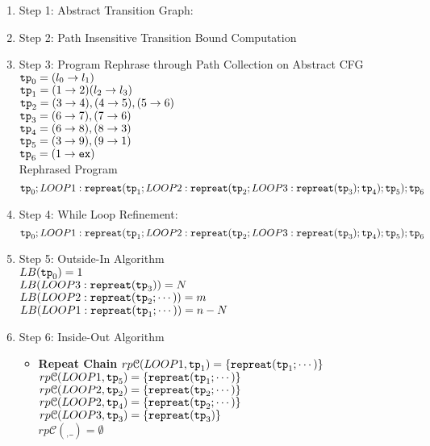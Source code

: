 \begin{enumerate}
    \item Step 1: Abstract Transition Graph:

\item Step 2: Path Insensitive Transition Bound Computation

\item Step 3: Program Rephrase through Path Collection on Abstract CFG
$\mathtt{tp}_0 = (l_0 \to l_1)$
\\
$\mathtt{tp}_1 = (1 \to 2) (l_2 \to l_3)$
\\
$\mathtt{tp}_2 = (3 \to 4), (4 \to 5), (5 \to 6)$
\\
$\mathtt{tp}_3 = (6 \to 7), (7 \to 6)$
\\
$\mathtt{tp}_4 = (6 \to 8), (8 \to 3)$
\\
$\mathtt{tp}_5 = (3 \to 9), (9 \to 1)$
\\
$\mathtt{tp}_6 = (1 \to \mathtt{ex})$
\\
Rephrased Program
\[
\mathtt{tp}_0 ; LOOP1: \mathtt{repreat}(\mathtt{tp}_1; LOOP2: \mathtt{repreat}(\mathtt{tp}_2; LOOP3 : \mathtt{repreat}(\mathtt{tp}_3); \mathtt{tp}_4); \mathtt{tp}_5); \mathtt{tp}_6
\]
\item Step 4: While Loop Refinement:
\[
\mathtt{tp}_0 ; LOOP1: \mathtt{repreat}(\mathtt{tp}_1; LOOP2: \mathtt{repreat}(\mathtt{tp}_2; LOOP3 : \mathtt{repreat}(\mathtt{tp}_3); \mathtt{tp}_4); \mathtt{tp}_5); \mathtt{tp}_6
\]
\item Step 5: Outside-In Algorithm
\\
$LB(\mathtt{tp}_0) = 1$
\\
$LB(LOOP3 : \mathtt{repreat}(\mathtt{tp}_3)) = N $
\\
$LB(LOOP2: \mathtt{repreat}(\mathtt{tp}_2; \cdots)) = m $
\\
$LB(LOOP1: \mathtt{repreat}(\mathtt{tp}_1; \cdots)) = n - N $
\\
\item Step 6: Inside-Out Algorithm
\begin{itemize}
    \item \textbf{Repeat Chain}
    $rp\mathcal{C}(LOOP1, \mathtt{tp}_1) = \{\mathtt{repreat}(\mathtt{tp}_1; \cdots)\}$ \\
    $rp\mathcal{C}(LOOP1, \mathtt{tp}_5) = \{\mathtt{repreat}(\mathtt{tp}_1; \cdots)\}$ \\
    $rp\mathcal{C}(LOOP2, \mathtt{tp}_2) = \{\mathtt{repreat}(\mathtt{tp}_2; \cdots)\}$ \\
    $rp\mathcal{C}(LOOP2, \mathtt{tp}_4) = \{\mathtt{repreat}(\mathtt{tp}_2; \cdots)\}$ \\
    $rp\mathcal{C}(LOOP3, \mathtt{tp}_3) = \{\mathtt{repreat}(\mathtt{tp}_3)\}$ \\
    $rp\mathcal{C}(_, \_) = \emptyset$ 

\end{itemize}
\end{enumerate}
